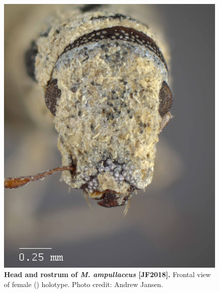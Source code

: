 \documentclass[fleqn,10pt,lineno]{wlpeerj} %
\begin{document}
\begin{figure}[h]
	\centering
	\includegraphics[width=\textwidth]{figure11.jpg}
	\caption{\textbf{Head and rostrum of \textit{M. ampullaceus} [JF2018].} Frontal view of female (\female) holotype. Photo credit: Andrew Jansen.}
	\label{fig:ampullaceus_F_frontal}
\end{figure}
\end{document}
